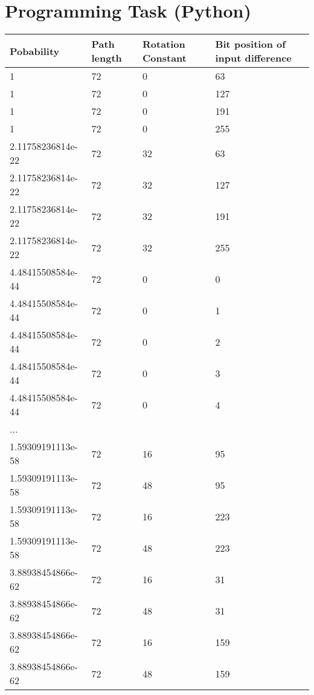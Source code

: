 \section{Programming Task (Python)}

\begin{table}[H]
    \begin{center}
        \begin{tabularx}{\textwidth}[]{XXXX}
            \hline
            \rowcolor{Gray} \textbf{Pobability} & \textbf{Path length} & \textbf{Rotation Constant} & \textbf{Bit position of input difference} \\
            \hline
            1  &  72  &  0  &  63 \\
            1  &  72  &  0  &  127 \\
            1  &  72  &  0  &  191 \\
            1  &  72  &  0  &  255 \\
            2.11758236814e-22  &  72  &  32  &  63 \\
            2.11758236814e-22  &  72  &  32  &  127 \\
            2.11758236814e-22  &  72  &  32  &  191 \\
            2.11758236814e-22  &  72  &  32  &  255 \\
            4.48415508584e-44  &  72  &  0  &  0 \\
            4.48415508584e-44  &  72  &  0  &  1 \\
            4.48415508584e-44  &  72  &  0  &  2 \\
            4.48415508584e-44  &  72  &  0  &  3 \\
            4.48415508584e-44  &  72  &  0  &  4 \\
            ... &&& \\
            1.59309191113e-58  &  72  &  16  &  95 \\
            1.59309191113e-58  &  72  &  48  &  95 \\
            1.59309191113e-58  &  72  &  16  &  223 \\
            1.59309191113e-58  &  72  &  48  &  223 \\
            3.88938454866e-62  &  72  &  16  &  31 \\
            3.88938454866e-62  &  72  &  48  &  31 \\
            3.88938454866e-62  &  72  &  16  &  159 \\
            3.88938454866e-62  &  72  &  48  &  159 \\

\end{tabularx}
\end{center}
\end{table}
